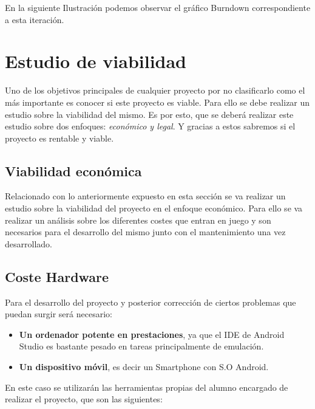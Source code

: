 En la siguiente Ilustración podemos observar el gráfico Burndown correspondiente a esta iteración.




\section{Estudio de viabilidad}

Uno de los objetivos principales de cualquier proyecto por no clasificarlo como el más importante es conocer si este proyecto es viable. Para ello se debe realizar un estudio sobre la viabilidad del mismo. Es por esto, que se deberá realizar este estudio sobre dos enfoques: \emph{económico y legal}. Y gracias a estos sabremos si el proyecto es rentable y viable.

\subsection{Viabilidad económica}

Relacionado con lo anteriormente expuesto en esta sección se va realizar un estudio sobre la viabilidad del proyecto en el enfoque económico. Para ello se va realizar un análisis sobre los diferentes costes que entran en juego y son necesarios para el desarrollo del mismo junto con el mantenimiento una vez desarrollado.

\subsection{Coste Hardware}

Para el desarrollo del proyecto y posterior corrección de ciertos problemas que puedan surgir será necesario:

\begin{itemize}

    \item \textbf{Un ordenador potente en prestaciones}, ya que el IDE de Android Studio es bastante pesado en tareas principalmente de emulación. 
	
	\item \textbf{Un dispositivo móvil}, es decir un Smartphone con S.O Android.

\end{itemize}

En este caso se utilizarán las herramientas propias del alumno encargado de realizar el proyecto, que son las siguientes:

